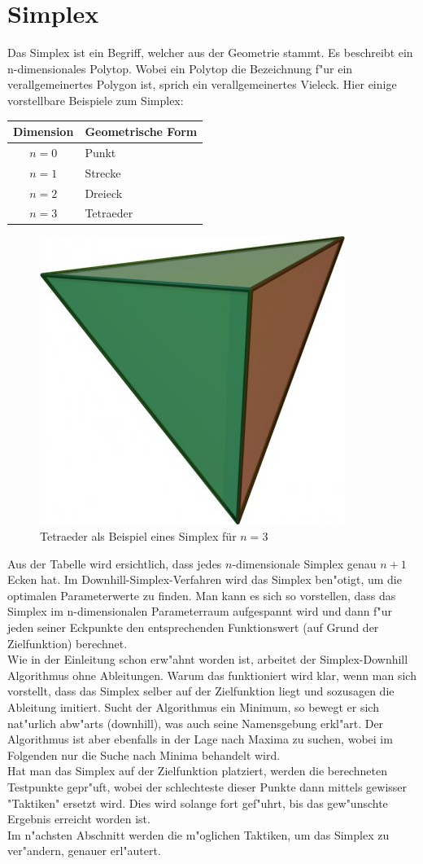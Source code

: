\section{Simplex}
Das Simplex ist ein Begriff, welcher aus der Geometrie stammt. Es beschreibt ein n-dimensionales Polytop. Wobei ein Polytop die Bezeichnung f"ur ein verallgemeinertes Polygon ist, sprich ein verallgemeinertes Vieleck. 
Hier einige vorstellbare Beispiele zum Simplex:
 
\begin{tabular}{c|l}
Dimension & Geometrische Form\\
\hline
$n=0$ & Punkt\\
$n=1$ & Strecke\\
$n=2$ & Dreieck\\
$n=3$ & Tetraeder
\end{tabular}

\begin{figure}
\centering
\includegraphics[height=0.25\textwidth]{../bilder/tetraeder.jpg}
\caption{Tetraeder als Beispiel eines Simplex für $n=3$}
\end{figure}

Aus der Tabelle wird ersichtlich, dass jedes $n$-dimensionale Simplex genau $n+1$ Ecken hat.
Im Downhill-Simplex-Verfahren wird das Simplex ben"otigt, um die optimalen Parameterwerte zu finden. Man kann es sich so vorstellen, dass das Simplex im n-dimensionalen Parameterraum aufgespannt wird und dann f"ur jeden seiner Eckpunkte den entsprechenden Funktionswert (auf Grund der Zielfunktion) berechnet. \\
Wie in der Einleitung schon erw"ahnt worden ist, arbeitet der Simplex-Downhill Algorithmus ohne Ableitungen. Warum das funktioniert wird klar, wenn man sich vorstellt, dass das Simplex selber auf der Zielfunktion liegt und sozusagen die Ableitung imitiert. Sucht der Algorithmus ein Minimum, so bewegt er sich nat"urlich abw"arts (downhill), was auch seine Namensgebung erkl"art. Der Algorithmus ist aber ebenfalls in der Lage nach Maxima zu suchen, wobei im Folgenden nur die Suche nach Minima behandelt wird.\\
Hat man das Simplex auf der Zielfunktion platziert, werden die berechneten Testpunkte gepr"uft, wobei der schlechteste dieser Punkte dann mittels gewisser "Taktiken" ersetzt wird. Dies wird solange fort gef"uhrt, bis das gew"unschte Ergebnis erreicht worden ist.\\ 
Im n"achsten Abschnitt werden die m"oglichen Taktiken, um das Simplex zu ver"andern, genauer erl"autert. 

